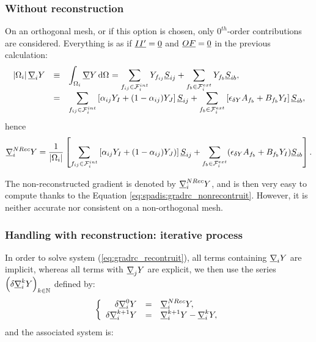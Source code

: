 \subsubsection{Without reconstruction}
On an orthogonal mesh, or if this option is chosen, only $0^{th}$-order contributions are considered.
Everything is as if
$\underline{I {I^\prime}} = \underline{0}$ and $\underline{O F} = \underline{0}$ in the previous calculation:
\begin{equation}\notag
\begin{array}{r c l}
\left| \Omega_{i} \right| \underline{\nabla}_i Y &\equiv & \displaystyle
\int_{\Omega_{i}} \underline{\nabla} Y\, \mathrm{d} \Omega_{} =\sum\limits_{{f_{ij}} \in \mathcal{F}^{int}_{i}} Y_{{f_{ij}}} \underline{S}_{{ij}} + \sum\limits_{{f_{b}} \in \mathcal{F}^{ext}_{i}} Y_{{f_{b}}} \underline{S}_{{ib}}, \\
 &=& \displaystyle
 \sum\limits_{ {f_{ij}} \in \mathcal{F}^{int}_{i}}
 \left[ \alpha_{{ij}} Y_I +
(1 - \alpha_{{ij}}) Y_J \right] \underline{S}_{{ij}}
+ \sum\limits_{ {f_{b}} \in \mathcal{F}^{ext}_{i}} \left[ \epsilon_{\delta Y} A_{{f_{b}}} + B_{{f_{b}}}Y_I \right] \underline{S}_{{ib}},
\end{array}
\end{equation}
hence
\begin{equation}\label{eq:spadis:gradrc_nonrecontruit}
\underline{\nabla}_i^{NRec} Y= \dfrac{1}{\left| \Omega_{i} \right|} \left[
  \sum\limits_{{f_{ij}} \in \mathcal{F}^{int}_{i}} \left[\alpha_{{ij}} Y_I + (1 - \alpha_{{ij}}) Y_J) \right] \underline{S}_{{ij}}
+\sum\limits_{{f_{b}} \in \mathcal{F}^{ext}_{i}}(\epsilon_{\delta Y} A_{{f_{b}}} + B_{{f_{b}}} Y_I
) \underline{S}_{{ib}} \right].
\end{equation}

\begin{remark}
The non-reconstructed gradient is denoted by $ \underline{\nabla}_i^{NRec} Y  $, and is then
very easy to compute thanks to the Equation \eqref{eq:spadis:gradrc_nonrecontruit}.
However, it is neither accurate nor consistent on a non-orthogonal mesh.
\end{remark}

\subsubsection{Handling with reconstruction: iterative process}

In order to solve system (\ref{eq:gradrc_recontruit}), all terms containing $\underline{\nabla}_i Y$ are implicit, whereas
all terms with $\underline{\nabla}_j Y$ are explicit, we then use the series $\left( \delta \underline{\nabla}_i^k Y \right)_{k \in \mathbb{N}}$ defined by:
%
\begin{equation}
\left\{\begin{array}{r c l}
\delta \underline{\nabla}_i^0 Y &=& \underline{\nabla}_i^{NRec} Y, \\
\delta \underline{\nabla}_i^{k+1} Y &= &\underline{\nabla}_i^{k+1} Y - \underline{\nabla}_i^k Y ,
\end{array}\right.
\end{equation}
%
and the associated system is:

